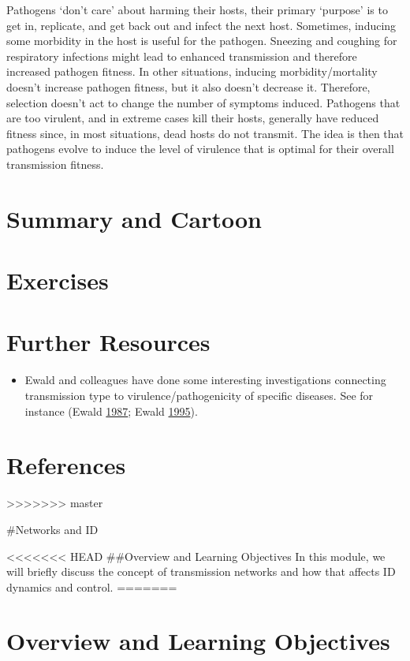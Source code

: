 \documentclass[]{book}
\providecommand{\tightlist}{%
  \setlength{\itemsep}{0pt}\setlength{\parskip}{0pt}}
\theoremstyle{definition}
\theoremstyle{definition}
\theoremstyle{definition}
\theoremstyle{remark}
\begin{document}
Pathogens `don't care' about harming their hosts, their primary
`purpose' is to get in, replicate, and get back out and infect the next
host. Sometimes, inducing some morbidity in the host is useful for the
pathogen. Sneezing and coughing for respiratory infections might lead to
enhanced transmission and therefore increased pathogen fitness. In other
situations, inducing morbidity/mortality doesn't increase pathogen
fitness, but it also doesn't decrease it. Therefore, selection doesn't
act to change the number of symptoms induced. Pathogens that are too
virulent, and in extreme cases kill their hosts, generally have reduced
fitness since, in most situations, dead hosts do not transmit. The idea
is then that pathogens evolve to induce the level of virulence that is
optimal for their overall transmission fitness.

\section{Summary and Cartoon}\label{summary-and-cartoon-16}

\section{Exercises}\label{exercises-16}

\section{Further Resources}\label{further-resources-16}

\begin{itemize}
\tightlist
\item
  Ewald and colleagues have done some interesting investigations
  connecting transmission type to virulence/pathogenicity of specific
  diseases. See for instance (Ewald
  \protect\hyperlink{ref-ewald87}{1987}; Ewald
  \protect\hyperlink{ref-ewald95}{1995}).
\end{itemize}

\section{References}\label{references-17}
>>>>>>> master

\#Networks and ID

<<<<<<< HEAD
\#\#Overview and Learning Objectives In this module, we will briefly
discuss the concept of transmission networks and how that affects ID
dynamics and control.
=======
\section{Overview and Learning
Objectives}\label{overview-and-learning-objectives-17}
\end{document}
